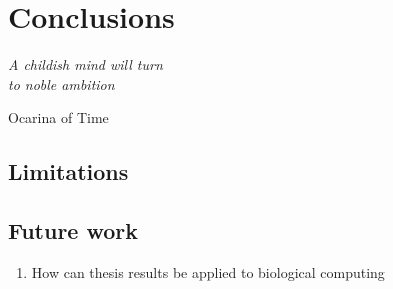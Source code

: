 \chapter{Conclusions}
\label{chapter:conclusions}
\epigraph{\textit{A childish mind will turn\\to noble ambition}}{Ocarina of Time}

\section{Limitations}

\section{Future work}


\begin{enumerate}
    \item How can thesis results be applied to biological computing \cite{Dalchau2018}
\end{enumerate}